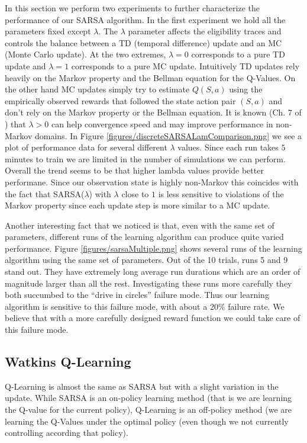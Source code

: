 \documentclass{article}
\begin{document}
In this section we perform two experiments to further characterize the performance of our SARSA algorithm. In the first experiment we hold all the parameters fixed except $\lambda$. The $\lambda$ parameter affects the eligibility traces and controls the balance between a TD (temporal difference) update and an MC (Monte Carlo update). At the two extremes, $\lambda = 0$ corresponds to a pure TD update and $\lambda = 1$ corresponds to a pure MC update. Intuitively TD updates rely heavily on the Markov property and the Bellman equation for the Q-Values. On the other hand MC updates simply try to estimate $Q(S,a)$ using the empirically observed rewards that followed the state action pair $(S,a)$ and don't rely on the Markov property or the Bellman equation. It is known (Ch. 7 of \cite{SuttonBarto})  that $\lambda > 0$ can help convergence speed and may improve performance in non-Markov domains. In Figure \ref{figures/discreteSARSALamComparison.png} we see a plot of performance data for several different $\lambda$ values. Since each run takes $5$ minutes to train we are limited in the number of simulations we can perform. Overall the trend seems to be that higher lambda values provide better performane. Since our observation state is highly non-Markov this coincides with the fact that SARSA($\lambda$) with $\lambda$ close to $1$ is less sensitive to violations of the Markov property since each update step is more similar to a MC update.


Another interesting fact that we noticed is that, even with the same set of parameters, different runs of the learning algorithm can produce quite varied performance. Figure \ref{figures/sarsaMultiple.png} shows several runs of the learning algorithm using the same set of parameters. Out of the 10 trials, runs 5 and 9 stand out. They have extremely long average run durations which are an order of magnitude larger than all the rest. Investigating these runs more carefully they both succumbed to the ``drive in circles'' failure mode. Thus our learning algorithm is sensitive to this failure mode, with about a $20\%$ failure rate. We believe that with a more carefully designed reward function we could take care of this failure mode.


\subsection{Watkins Q-Learning}
\label{discrete_q_learning}

Q-Learning is almost the same as SARSA but with a slight variation in the update. While SARSA is an on-policy learning method (that is we are learning the Q-value for the current policy), Q-Learning is an off-policy method (we are learning the Q-Values under the optimal policy (even though we not currently controlling according that policy).
\end{document}
